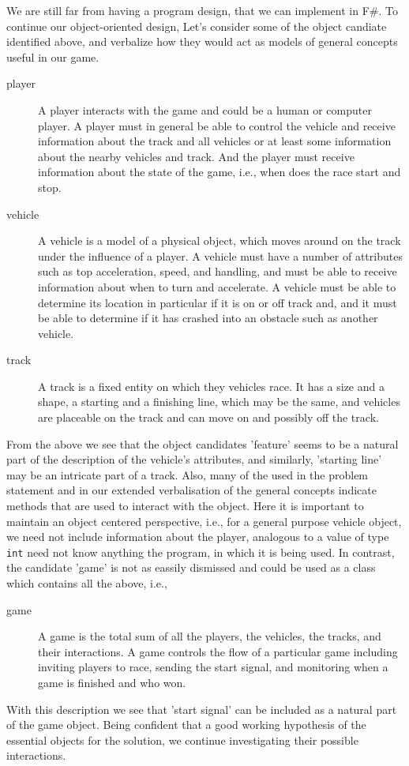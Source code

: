 We are still far from having a program design, that we can implement in F\#. To continue our object-oriented design, Let's consider some of the object candiate identified above, and verbalize how they would act as models of general concepts useful in our game.
\begin{description}
\item[player] A player interacts with the game and could be a human or computer player. A player must in general be able to control the vehicle and receive information about the track and all vehicles or at least some information about the nearby vehicles and track. And the player must receive information about the state of the game, i.e., when does the race start and stop.
\item[vehicle] A vehicle is a model of a physical object, which moves around on the track under the influence of a player. A vehicle must have a number of attributes such as top acceleration, speed, and handling, and must be able to receive information about when to turn and accelerate. A vehicle must be able to determine its location in particular if it is on or off track and, and it must be able to determine if it has crashed into an obstacle such as another vehicle.
\item[track] A track is a fixed entity on which they vehicles race. It has a size and a shape, a starting and a finishing line, which may be the same, and vehicles are placeable on the track and can move on and possibly off the track.
\end{description}
From the above we see that the object candidates 'feature' seems to be a natural part of the description of the vehicle's attributes, and similarly, 'starting line' may be an intricate part of a track. Also, many of the  used in the problem statement and in our extended verbalisation of the general concepts indicate methods that are used to interact with the object. Here it is important to maintain an object centered perspective, i.e., for a general purpose vehicle object, we need not include information about the player, analogous to a value of type \lstinline|int| need not know anything the program, in which it is being used. In contrast, the candidate 'game' is not as eassily dismissed and could be used as a class which contains all the above, i.e.,
\begin{description}
\item[game] A game is the total sum of all the players, the vehicles, the tracks, and their interactions. A game controls the flow of a particular game including inviting players to race, sending the start signal, and monitoring when a game is finished and who won.
\end{description}
With this description we see that 'start signal' can be included as a natural part of the game object. Being confident that a good working hypothesis of the essential objects for the solution, we continue investigating their possible interactions.

